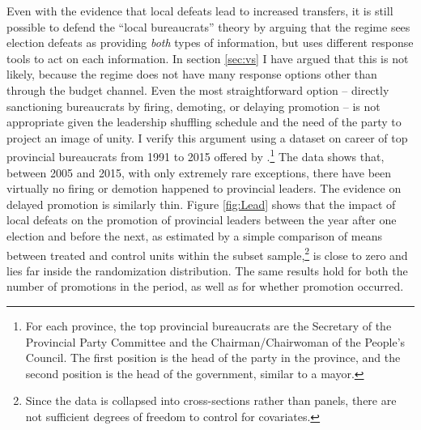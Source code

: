 \documentclass[12pt]{article}\usepackage[]{graphicx}\usepackage[]{color}
\newcommand{\1}{\mathbbm{1}}
\begin{document}
Even with the evidence that local defeats lead to increased transfers, it is still possible to defend the ``local bureaucrats'' theory by arguing that the regime sees election defeats as providing \textit{both} types of information, but uses different response tools to act on each information. In section \ref{sec:vs} I have argued that this is not likely, because the regime does not have many response options other than through the budget channel. Even the most straightforward option -- directly sanctioning bureaucrats by firing, demoting, or delaying promotion -- is not appropriate given the leadership shuffling schedule and the need of the party to project an image of unity. I verify this argument using a dataset on career of top provincial bureaucrats from 1991 to 2015 offered by \cite{MaleskyPhan2017}.\footnote{For each province, the top provincial bureaucrats are the Secretary of the Provincial Party Committee and the Chairman/Chairwoman of the People's Council. The first position is the head of the party in the province, and the second position is the head of the government, similar to a mayor.} The data shows that, between 2005 and 2015, with only extremely rare exceptions, there have been virtually no firing or demotion happened to provincial leaders. The evidence on delayed promotion is similarly thin. Figure \ref{fig:Lead} shows that the impact of local defeats on the promotion of provincial leaders between the year after one election and before the next, as estimated by a simple comparison of means between treated and control units within the subset sample,\footnote{Since the data is collapsed into cross-sections rather than panels, there are not sufficient degrees of freedom to control for covariates.} is close to zero and lies far inside the randomization distribution. The same results hold for both the number of promotions in the period, as well as for whether  promotion occurred. 
\end{document}
